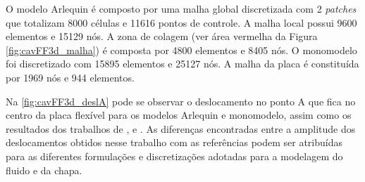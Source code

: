 \begin{figure}[!htbp]
\end{figure}

O modelo Arlequin é composto por uma malha global discretizada com 2 \textit{patches} que totalizam 8000 células e 11616 pontos de controle. A malha local possui 9600 elementos e 15129 nós. A zona de colagem (ver área vermelha da Figura \ref{fig:cavFF3d_malha}) é composta por 4800 elementos e 8405 nós.  O monomodelo foi discretizado com 15895 elementos e 25127 nós. A malha da placa é constituída por 1969 nós e 944 elementos.

Na \autoref{fig:cavFF3d_deslA} pode se observar o deslocamento no ponto A que fica no centro da placa flexível para os modelos Arlequin e monomodelo, assim como os resultados dos trabalhos de , e . As diferenças encontradas entre a amplitude dos deslocamentos obtidos nesse trabalho com as referências podem ser atribuídas para as diferentes formulações e discretizações adotadas para a modelagem do fluido e da chapa.

